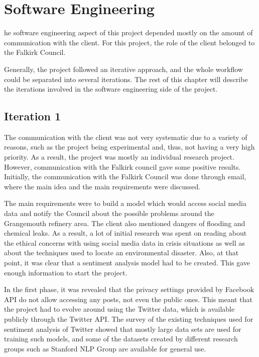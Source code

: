\let\textcircled=\pgftextcircled
\chapter{Software Engineering}
\label{chap:software-engineering}

he software engineering aspect of this project depended mostly on the amount of communication with the client. For this project, the role of the client belonged to the Falkirk Council. 

Generally, the project followed an iterative approach, and the whole workflow could be separated into several iterations. The rest of this chapter will describe the iterations involved in the software engineering side of the project. 

\section{Iteration 1}
\label{sec:it1}

The communication with the client was not very systematic due to a variety of reasons, such as the project being experimental and, thus, not having a very high priority. As a result, the project was mostly an individual research project. However, communication with the Falkirk council gave some positive results. Initially, the communication with the Falkirk Council was done through email, where the main idea and the main requirements were discussed.

The main requirements were to build a model which would access social media data and notify the Council about the possible problems around the Grangemouth refinery area. The client also mentioned dangers of flooding and chemical leaks. As a result, a lot of initial research was spent on reading about the ethical concerns with using social media data in crisis situations as well as about the techniques used to locate an environmental disaster. Also, at that point, it was clear that a sentiment analysis model had to be created. 
This gave enough information to start the project. 

In the first phase, it was revealed that the privacy settings provided by Facebook API do not allow accessing any posts, not even the public ones. This meant that the project had to evolve around using the Twitter data, which is available publicly through the Twitter API. The survey of the existing techniques used for sentiment analysis of Twitter showed that mostly large data sets are used for training such models, and some of the datasets created by different research groups such as Stanford NLP Group are available for general use. 

